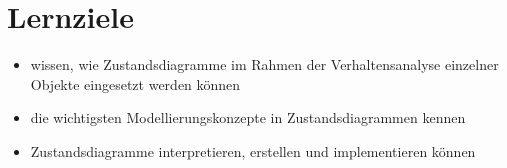 \section{Lernziele}

\begin{itemize}
    \item wissen, wie Zustandsdiagramme im Rahmen der Verhaltensanalyse einzelner Objekte eingesetzt werden können
    \item die wichtigsten Modellierungskonzepte in Zustandsdiagrammen kennen
    \item Zustandsdiagramme interpretieren, erstellen und implementieren können
\end{itemize}

